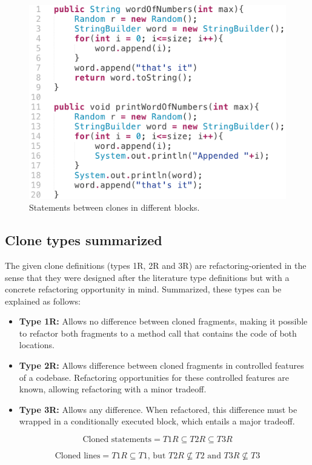\begin{figure}[H]
  \centering
  \includegraphics[width=0.6\columnwidth]{img/type3invalid}
  \caption{Statements between clones in different blocks.}
  \label{fig:type3invalid}
\end{figure}

\subsection{Clone types summarized}
The given clone definitions (types 1R, 2R and 3R) are refactoring-oriented in the sense that they were designed after the literature type definitions but with a concrete refactoring opportunity in mind. Summarized, these types can be explained as follows:

\begin{itemize}
\item \textbf{Type 1R:} Allows no difference between cloned fragments, making it possible to refactor both fragments to a method call that contains the code of both locations. \\
\item \textbf{Type 2R:} Allows difference between cloned fragments in controlled features of a codebase. Refactoring opportunities for these controlled features are known, allowing refactoring with a minor tradeoff. \\
\item \textbf{Type 3R:} Allows any difference. When refactored, this difference must be wrapped in a conditionally executed block, which entails a major tradeoff.
\end{itemize}

\begin{equation}\label{eq:typerelation}
\text{Cloned statements} = T1R \subseteq T2R \subseteq T3R
\end{equation}

\begin{equation}\label{eq:typerelation2}
\text{Cloned lines} = T1R \subseteq T1 \text{, but } T2R	\nsubseteq T2 \text{ and } T3R \nsubseteq T3
\end{equation}

